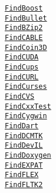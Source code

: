 \documentclass{article}
\newcommand{\cmakemodule}[1]{{\href{https://cmake.org/cmake/help/v3.13/module/#1.html}{{\lstinline{#1}}}}}
\begin{document}
\begin{minipage}[t]{0.18\linewidth}
\cmakemodule{FindBoost}\\
\cmakemodule{FindBullet}\\
\cmakemodule{FindBZip2}\\
\cmakemodule{FindCABLE}\\
\cmakemodule{FindCoin3D}\\
\cmakemodule{FindCUDA}\\
\cmakemodule{FindCups}\\
\cmakemodule{FindCURL}\\
\cmakemodule{FindCurses}\\
\cmakemodule{FindCVS}\\
\cmakemodule{FindCxxTest}\\
\cmakemodule{FindCygwin}\\
\cmakemodule{FindDart}\\
\cmakemodule{FindDCMTK}\\
\cmakemodule{FindDevIL}\\
\cmakemodule{FindDoxygen}\\
\cmakemodule{FindEXPAT}\\
\cmakemodule{FindFLEX}\\
\cmakemodule{FindFLTK2}\\
\end{minipage}
\hfill\vline\hfill
\end{document}
